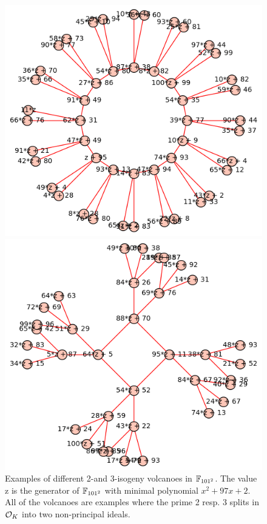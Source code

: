 \begin{figure}
\begin{minipage}{0.5\textwidth}
    \end{minipage}
    \begin{minipage}{0.5\textwidth}
        \includegraphics[width = \textwidth]{../example_II.png}
    \end{minipage}%
    \begin{minipage}{0.5\textwidth}
        \includegraphics[width = \textwidth]{../example_III.png}
    \end{minipage}
    \caption{
        \label{fig:example_vulcanos} Examples of different 2-and 3-isogeny volcanoes in $\mathbb{F}_{101^2}$. 
        The value $\mathrm{z}$ is the generator of $\mathbb{F}_{101^2}$ with minimal polynomial $x^2 + 97x + 2$.
        All of the volcanoes are examples where the prime 2 resp. 3 splits in $\mathcal{O}_K$ into two non-principal ideals.
    }
\end{figure}
